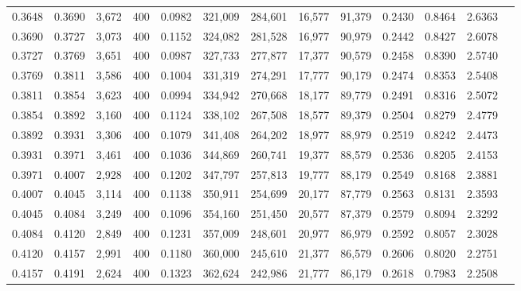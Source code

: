 \begin{tabular}{rrrrrrrrrrrrr}
0.3648 & 0.3690 &  3,672 &   400 &                                     0.0982 & 321,009 & 284,601 &  16,577 &  91,379 & 0.2430 & 0.8464 & 2.6363 \\
0.3690 & 0.3727 &  3,073 &   400 &                                     0.1152 & 324,082 & 281,528 &  16,977 &  90,979 & 0.2442 & 0.8427 & 2.6078 \\
0.3727 & 0.3769 &  3,651 &   400 &                                     0.0987 & 327,733 & 277,877 &  17,377 &  90,579 & 0.2458 & 0.8390 & 2.5740 \\
0.3769 & 0.3811 &  3,586 &   400 &                                     0.1004 & 331,319 & 274,291 &  17,777 &  90,179 & 0.2474 & 0.8353 & 2.5408 \\
0.3811 & 0.3854 &  3,623 &   400 &                                     0.0994 & 334,942 & 270,668 &  18,177 &  89,779 & 0.2491 & 0.8316 & 2.5072 \\
0.3854 & 0.3892 &  3,160 &   400 &                                     0.1124 & 338,102 & 267,508 &  18,577 &  89,379 & 0.2504 & 0.8279 & 2.4779 \\
0.3892 & 0.3931 &  3,306 &   400 &                                     0.1079 & 341,408 & 264,202 &  18,977 &  88,979 & 0.2519 & 0.8242 & 2.4473 \\
0.3931 & 0.3971 &  3,461 &   400 &                                     0.1036 & 344,869 & 260,741 &  19,377 &  88,579 & 0.2536 & 0.8205 & 2.4153 \\
0.3971 & 0.4007 &  2,928 &   400 &                                     0.1202 & 347,797 & 257,813 &  19,777 &  88,179 & 0.2549 & 0.8168 & 2.3881 \\
0.4007 & 0.4045 &  3,114 &   400 &                                     0.1138 & 350,911 & 254,699 &  20,177 &  87,779 & 0.2563 & 0.8131 & 2.3593 \\
0.4045 & 0.4084 &  3,249 &   400 &                                     0.1096 & 354,160 & 251,450 &  20,577 &  87,379 & 0.2579 & 0.8094 & 2.3292 \\
0.4084 & 0.4120 &  2,849 &   400 &                                     0.1231 & 357,009 & 248,601 &  20,977 &  86,979 & 0.2592 & 0.8057 & 2.3028 \\
0.4120 & 0.4157 &  2,991 &   400 &                                     0.1180 & 360,000 & 245,610 &  21,377 &  86,579 & 0.2606 & 0.8020 & 2.2751 \\
0.4157 & 0.4191 &  2,624 &   400 &                                     0.1323 & 362,624 & 242,986 &  21,777 &  86,179 & 0.2618 & 0.7983 & 2.2508 \\

\end{tabular}
